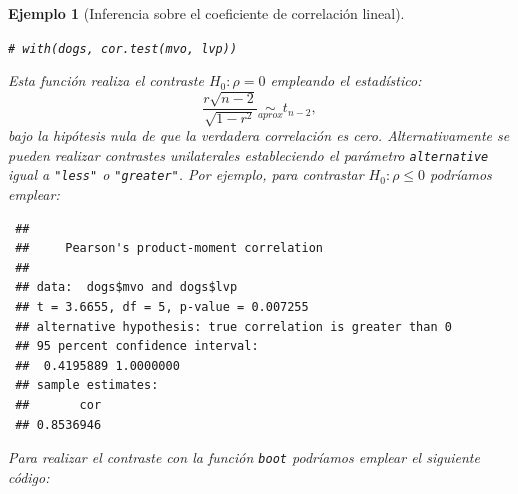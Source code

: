 \documentclass[
]{book}
\newenvironment{Shaded}{\begin{snugshade}}{\end{snugshade}}
\newcommand{\AttributeTok}[1]{\textcolor[rgb]{0.77,0.63,0.00}{#1}}
\newcommand{\CommentTok}[1]{\textcolor[rgb]{0.56,0.35,0.01}{\textit{#1}}}
\newcommand{\ControlFlowTok}[1]{\textcolor[rgb]{0.13,0.29,0.53}{\textbf{#1}}}
\newcommand{\DecValTok}[1]{\textcolor[rgb]{0.00,0.00,0.81}{#1}}
\newcommand{\FunctionTok}[1]{\textcolor[rgb]{0.00,0.00,0.00}{#1}}
\newcommand{\NormalTok}[1]{#1}
\newcommand{\OtherTok}[1]{\textcolor[rgb]{0.56,0.35,0.01}{#1}}
\newcommand{\SpecialCharTok}[1]{\textcolor[rgb]{0.00,0.00,0.00}{#1}}
\newcommand{\StringTok}[1]{\textcolor[rgb]{0.31,0.60,0.02}{#1}}
\theoremstyle{break}
\newtheorem{example}{Ejemplo}[chapter]
\theoremstyle{nonumberplain}
\renewcommand{\CommentTok}[1]{\textcolor[rgb]{0.41,0.41,0.41}{\texttt{#1}}}
\begin{document}
\begin{example}[Inferencia sobre el coeficiente de correlación lineal]
\begin{Shaded}
\begin{Highlighting}[]
\CommentTok{\# with(dogs, cor.test(mvo, lvp))}
\end{Highlighting}
\end{Shaded}

Esta función realiza el contraste \(H_0: \rho = 0\) empleando el estadístico:
\[\frac{r\sqrt{n - 2}}{\sqrt{1 - r^2}} \underset{aprox}{\sim } t_{n-2},\]
bajo la hipótesis nula de que la verdadera correlación es cero.
Alternativamente se pueden realizar contrastes unilaterales estableciendo
el parámetro \texttt{alternative} igual a \texttt{"less"} o \texttt{"greater"}.
Por ejemplo, para contrastar \(H_0: \rho \leq 0\) podríamos emplear:

\begin{Shaded}
\end{Shaded}

\begin{verbatim}
 ## 
 ##     Pearson's product-moment correlation
 ## 
 ## data:  dogs$mvo and dogs$lvp
 ## t = 3.6655, df = 5, p-value = 0.007255
 ## alternative hypothesis: true correlation is greater than 0
 ## 95 percent confidence interval:
 ##  0.4195889 1.0000000
 ## sample estimates:
 ##       cor 
 ## 0.8536946
\end{verbatim}

Para realizar el contraste con la función \texttt{boot} podríamos
emplear el siguiente código:

\begin{Shaded}
\end{Shaded}


\end{example}
\end{document}
